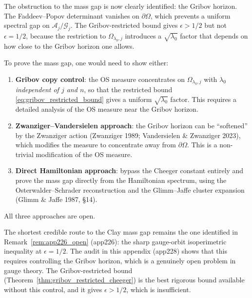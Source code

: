 \begin{remark}
\label{rem:obstruction}
The obstruction to the mass gap is now clearly identified: the
Gribov horizon. The Faddeev--Popov determinant vanishes on
$\partial\Omega$, which prevents a uniform spectral gap on
$\mathcal{A}_{j}/\mathcal{G}_{j}$. The Gribov-restricted bound
gives $\epsilon>1/2$ but not $\epsilon=1/2$, because the
restriction to $\Omega_{\lambda_{0},j}$ introduces a
$\sqrt{\lambda_{0}}$ factor that depends on how close to the
Gribov horizon one allows.

To prove the mass gap, one would need to show either:
\begin{enumerate}
\item \textbf{Gribov copy control}: the OS measure concentrates
on $\Omega_{\lambda_{0},j}$ with $\lambda_{0}$ \emph{independent
of $j$ and $n$}, so that the restricted bound
\eqref{eq:gribov_restricted_bound} gives a uniform
$\sqrt{\lambda_{0}}$ factor. This requires a detailed analysis
of the OS measure near the Gribov horizon.
\item \textbf{Zwanziger--Vandersielen approach}: the Gribov
horizon can be ``softened'' by the Zwanziger action
(Zwanziger 1989; Vandersielen \& Zwanziger 2023), which
modifies the measure to concentrate away from $\partial\Omega$.
This is a non-trivial modification of the OS measure.
\item \textbf{Direct Hamiltonian approach}: bypass the Cheeger
constant entirely and prove the mass gap directly from the
Hamiltonian spectrum, using the Osterwalder--Schrader
reconstruction and the Glimm--Jaffe cluster expansion
(Glimm \& Jaffe 1987, \S 14).
\end{enumerate}
All three approaches are open.
\end{remark}

\begin{remark}
\label{rem:shortest_route}
The shortest credible route to the Clay mass gap remains the
one identified in Remark~\ref{rem:app226_open} (app226): the
sharp gauge-orbit isoperimetric inequality at $\epsilon=1/2$.
The audit in this appendix (app228) shows that this requires
controlling the Gribov horizon, which is a genuinely open
problem in gauge theory. The Gribov-restricted bound
(Theorem~\ref{thm:gribov_restricted_cheeger}) is the best
rigorous bound available without this control, and it gives
$\epsilon>1/2$, which is insufficient.
\end{remark}

\endinput
